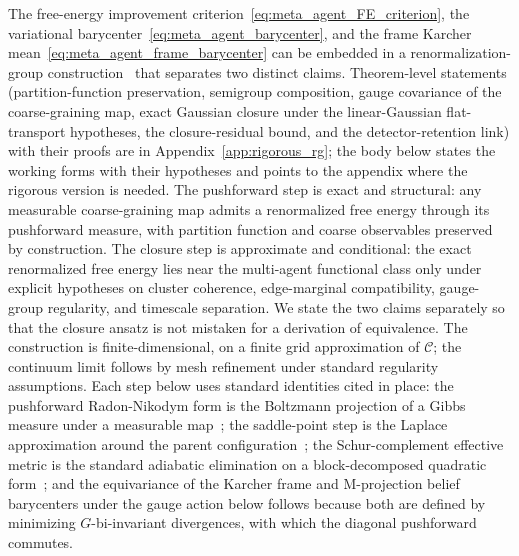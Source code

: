 \documentclass[11pt]{article}
\begin{document}
The free-energy improvement criterion~\eqref{eq:meta_agent_FE_criterion}, the variational barycenter~\eqref{eq:meta_agent_barycenter}, and the frame Karcher mean~\eqref{eq:meta_agent_frame_barycenter} can be embedded in a renormalization-group construction~\cite{Wilson1971, Cardy1996} that separates two distinct claims. Theorem-level statements (partition-function preservation, semigroup composition, gauge covariance of the coarse-graining map, exact Gaussian closure under the linear-Gaussian flat-transport hypotheses, the closure-residual bound, and the detector-retention link) with their proofs are in Appendix~\ref{app:rigorous_rg}; the body below states the working forms with their hypotheses and points to the appendix where the rigorous version is needed. The pushforward step is exact and structural: any measurable coarse-graining map admits a renormalized free energy through its pushforward measure, with partition function and coarse observables preserved by construction. The closure step is approximate and conditional: the exact renormalized free energy lies near the multi-agent functional class only under explicit hypotheses on cluster coherence, edge-marginal compatibility, gauge-group regularity, and timescale separation. We state the two claims separately so that the closure ansatz is not mistaken for a derivation of equivalence. The construction is finite-dimensional, on a finite grid approximation of $\mathcal{C}$; the continuum limit follows by mesh refinement under standard regularity assumptions. Each step below uses standard identities cited in place: the pushforward Radon-Nikodym form is the Boltzmann projection of a Gibbs measure under a measurable map~\cite{Cardy1996}; the saddle-point step is the Laplace approximation around the parent configuration~\cite{Cardy1996}; the Schur-complement effective metric is the standard adiabatic elimination on a block-decomposed quadratic form~\cite{HornJohnson2013}; and the equivariance of the Karcher frame and M-projection belief barycenters under the gauge action below follows because both are defined by minimizing $G$-bi-invariant divergences, with which the diagonal pushforward commutes.
\end{document}
